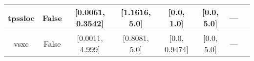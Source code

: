 \begin{tabular}{|c|c|c|c|c|c|c|l|}
      tpssloc &                 False & [0.0061, 0.3542] &    [1.1616, 5.0] &    [0.0, 1.0] &     [0.0, 5.0] &        --- &                                                       \cite{Constantin2012_035130} \\ \hline
         vsxc &                 False &  [0.0011, 4.999] &    [0.8081, 5.0] & [0.0, 0.9474] &     [0.0, 5.0] &        --- &                                                          \cite{VanVoorhis1998_400} \\ \hline
\end{tabular}